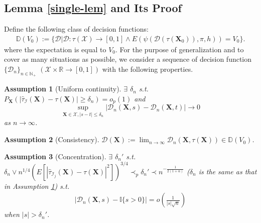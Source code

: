 \documentclass[11pt]{article}
\theoremstyle{referenceplain}
\newtheorem{assumption}{Assumption}
\theoremstyle{referencedefinition}
\theoremstyle{referenceremark}
\begin{document}
\subsection{Lemma \ref{single-lem} and Its Proof}
Define the following class of decision functions:
\begin{align*}
    \mathbb{D}(V_0):=\{\mathcal{D}|\mathcal{D}:\tau(\mathcal{X})\to[0,1]\land E(\psi(\mathcal{D}(\tau(\mathbf{X}_0)),\pi,h))=V_0\}.
\end{align*}
where the expectation is equal to $V_0$. For the purpose of generalization and to cover as many situations as possible, we consider a sequence of decision function  $\{\mathcal{D}_n\}_{n\in\mathbb{N}_+}$ $(\mathcal{X}\times\mathbb{R}\to[0,1])$ with the following properties.
\setcounter{assumption}{9}
\begin{assumption}[Uniform continuity]\label{A10}
    $\exists$ $\delta_n$ s.t. $P_{\mathbf{X}}(|\widehat{\tau}_{\mathcal{I}}(\mathbf{X})-\tau(\mathbf{X})|\ge \delta_n)=o_p(1)$ and $$\sup_{\mathbf{X}\in\mathcal{X},|s-t|\leq \delta_n}|\mathcal{D}_n(\mathbf{X},s)-\mathcal{D}_n(\mathbf{X},t)|\to 0$$ as $n\to\infty$.
\end{assumption}
\begin{assumption}[Consistency]\label{A11}
    $\mathcal{D}(\mathbf{X}):=\displaystyle{\lim_{n\to\infty}}\mathcal{D}_n(\mathbf{X},\tau(\mathbf{X}))\in\mathbb{D}(V_0)$.
\end{assumption}
\begin{assumption}[Concentration]\label{A12}
    $\exists$ $\delta_n'$ s.t. $\delta_n\lor n^{1/4}\left(E[|\widehat{\tau}_{\mathcal{I}_j}(\mathbf{X})-\tau(\mathbf{X})|^2]\right)^{3/4} \prec_p\delta_n'\prec n^{-\frac{1}{2(1+\alpha)}}$ ($\delta_n$ is the same as that in Assumption \ref{A10}) s.t. 
\begin{align}
    |\mathcal{D}_n(\mathbf{X},s)-\mathbb{I}\{s>0\}|=o\left(\frac{1}{{|s|}\sqrt{n}}\right)\label{A10-1}
\end{align}
when $|s|>\delta_n'$.
\end{assumption}
\end{document}
